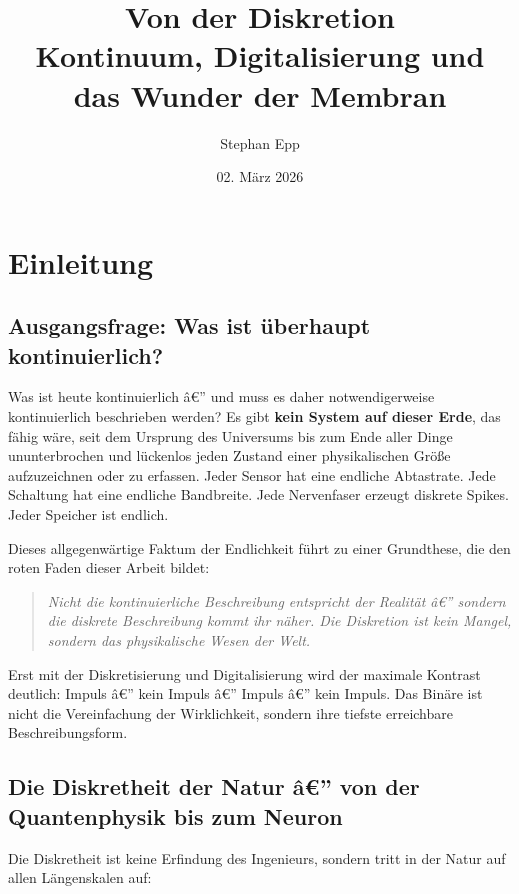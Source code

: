 ﻿\documentclass[12pt,a4paper,titlepage]{report}
\title{\textbf{Von der Diskretion} \\ 
	\large Kontinuum, Digitalisierung und das Wunder der Membran}
\author{Stephan Epp}
\date{02. März 2026}
\begin{document}
\maketitle

\newpage
\tableofcontents
\newpage

\chapter{Einleitung}

\section{Ausgangsfrage: Was ist überhaupt kontinuierlich?}

Was ist heute kontinuierlich â€” und muss es daher notwendigerweise kontinuierlich
beschrieben werden?
Es gibt \textbf{kein System auf dieser Erde}, das fähig wäre, seit dem Ursprung
des Universums bis zum Ende aller Dinge ununterbrochen und lückenlos jeden
Zustand einer physikalischen Größe aufzuzeichnen oder zu erfassen.
Jeder Sensor hat eine endliche Abtastrate.
Jede Schaltung hat eine endliche Bandbreite.
Jede Nervenfaser erzeugt diskrete Spikes.
Jeder Speicher ist endlich.

Dieses allgegenwärtige Faktum der Endlichkeit führt zu einer Grundthese,
die den roten Faden dieser Arbeit bildet:

\begin{quote}
	\itshape
	Nicht die kontinuierliche Beschreibung entspricht der Realität â€”
	sondern die diskrete Beschreibung kommt ihr näher.
	Die Diskretion ist kein Mangel, sondern das physikalische Wesen der Welt.
\end{quote}

Erst mit der Diskretisierung und Digitalisierung wird der maximale Kontrast
deutlich: Impuls â€” kein Impuls â€” Impuls â€” kein Impuls.
Das Binäre ist nicht die Vereinfachung der Wirklichkeit, sondern ihre tiefste
erreichbare Beschreibungsform.

\section{Die Diskretheit der Natur â€” von der Quantenphysik bis zum Neuron}

Die Diskretheit ist keine Erfindung des Ingenieurs, sondern tritt in der Natur
auf allen Längenskalen auf:
\end{document}
